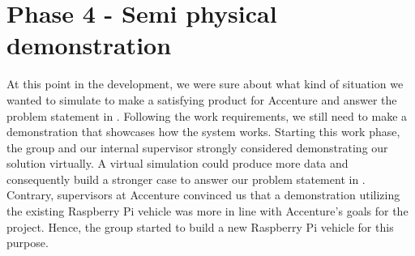 \section{Phase 4 - Semi physical demonstration}
At this point in the development, we were sure about what kind of situation we wanted to simulate to make a satisfying product for Accenture and answer the problem statement in . Following the work requirements, we still need to make a demonstration that showcases how the system works. Starting this work phase, the group and our internal supervisor strongly considered demonstrating our solution virtually. A virtual simulation could produce more data and consequently build a stronger case to answer our problem statement in . Contrary, supervisors at Accenture convinced us that a demonstration utilizing the existing Raspberry Pi vehicle was more in line with Accenture's goals for the project. Hence, the group started to build a new Raspberry Pi vehicle for this purpose.




\clearpage
%
%

